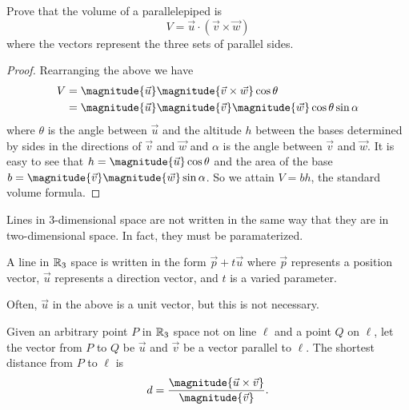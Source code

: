 \documentclass[12pt]{scrartcl}
\begin{document}
\begin{example}
    Prove that the volume of a parallelepiped is
    \[V = \vec{u} \cdot (\vec{v} \times \vec{w})\]
    where the vectors represent the three sets of parallel sides.

    \begin{proof}
        Rearranging the above we have
        \begin{align*}
            V &= \magnitude{\vec{u}} \magnitude{\vec{v} \times \vec{w}} \cos\theta \\
            &= \magnitude{\vec{u}} \magnitude{\vec{v}} \magnitude{\vec{w}} \cos\theta \sin\alpha
        \end{align*}
        where $\theta$ is the angle between $\vec{u}$ and the altitude $h$ between the bases determined by sides in the directions of $\vec{v}$ and $\vec{w}$ and $\alpha$ is the angle between $\vec{v}$ and $\vec{w}$. It is easy to see that $h = \magnitude{\vec{u}}\cos\theta$ and the area of the base $b = \magnitude{\vec{v}} \magnitude{\vec{w}} \sin\alpha$. So we attain $V = bh$, the standard volume formula.
    \end{proof}
\end{example}

Lines in 3-dimensional space are not written in the same way that they are in two-dimensional space. In fact, they must be paramaterized.

\begin{definition}
    A line in $\mathbb R_{3}$ space is written in the form $\vec{p} + t\vec{u}$ where $\vec{p}$ represents a position vector, $\vec{u}$ represents a direction vector, and $t$ is a varied parameter.
\end{definition}

\begin{remark}
    Often, $\vec{u}$ in the above is a unit vector, but this is not necessary.
\end{remark}

\begin{theorem}
    Given an arbitrary point $P$ in $\mathbb R_{3}$ space not on line $\ell$ and a point $Q$ on $\ell$, let the vector from $P$ to $Q$ be $\vec{u}$ and $\vec{v}$ be a vector parallel to $\ell$. The shortest distance from $P$ to $\ell$ is
    \[d = \frac{\magnitude{\vec{u} \times \vec{v}}}{\magnitude{\vec{v}}}.\]
\end{theorem}
\end{document}
